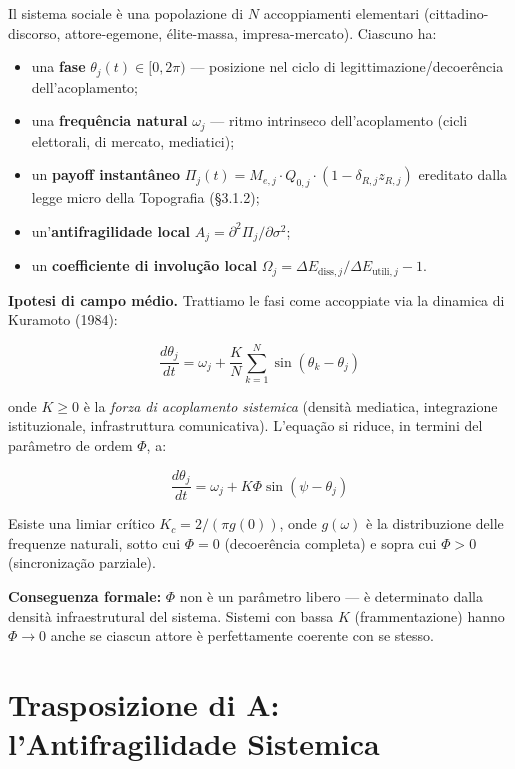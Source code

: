 Il sistema sociale è una popolazione di \(N\) accoppiamenti elementari
(cittadino-discorso, attore-egemone, élite-massa, impresa-mercato).
Ciascuno ha:

\begin{itemize}
\tightlist
\item
  una \textbf{fase} \(\theta_j(t) \in [0, 2\pi)\) --- posizione nel
  ciclo di legittimazione/decoerência dell'acoplamento;
\item
  una \textbf{frequência natural} \(\omega_j\) --- ritmo intrinseco
  dell'acoplamento (cicli elettorali, di mercato, mediatici);
\item
  un \textbf{payoff instantâneo}
  \(\Pi_j(t) = M_{e,j} \cdot Q_{0,j} \cdot (1 - \delta_{R,j} z_{R,j})\)
  ereditato dalla legge micro della Topografia (\S{}3.1.2);
\item
  un'\textbf{antifragilidade local}
  \(A_j = \partial^2 \Pi_j / \partial \sigma^2\);
\item
  un \textbf{coefficiente di involução local}
  \(\Omega_j = \Delta E_{\text{diss},j}/\Delta E_{\text{utili},j} - 1\).
\end{itemize}

\Hypoth{} \textbf{Ipotesi di campo médio.} Trattiamo le fasi come
accoppiate via la dinamica di Kuramoto (1984):

\[
\frac{d\theta_j}{dt} = \omega_j + \frac{K}{N}\sum_{k=1}^{N} \sin(\theta_k - \theta_j)
\]

onde \(K \geq 0\) è la \emph{forza di acoplamento sistemica} (densità
mediatica, integrazione istituzionale, infrastruttura comunicativa).
L'equação si riduce, in termini del parâmetro de ordem \(\Phi\), a:

\[
\frac{d\theta_j}{dt} = \omega_j + K\Phi \sin(\psi - \theta_j)
\]

Esiste una limiar crítico \(K_c = 2/(\pi g(0))\), onde \(g(\omega)\) è
la distribuzione delle frequenze naturali, sotto cui \(\Phi = 0\)
(decoerência completa) e sopra cui \(\Phi > 0\) (sincronização
parziale).

\Proved{} \textbf{Conseguenza formale:} \(\Phi\) non è un parâmetro
libero --- è determinato dalla densità infraestrutural del sistema.
Sistemi con bassa \(K\) (frammentazione) hanno \(\Phi \to 0\) anche se
ciascun attore è perfettamente coerente con se stesso.



\section{Trasposizione di A: l'Antifragilidade
Sistemica}\label{trasposizione-di-a-lantifragilituxe0-sistemica}

